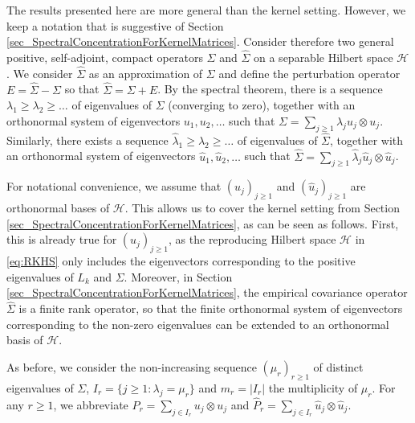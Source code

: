 \documentclass[a4paper,11pt]{article} %
\numberwithin{equation}{section}
\theoremstyle{definition}
\theoremstyle{remark}
\theoremstyle{plain}
\begin{document}
The results presented here are more general than the kernel setting.
However, we keep a notation that is suggestive of Section \ref{sec_SpectralConcentrationForKernelMatrices}.
Consider therefore two general positive, self-adjoint, compact operators \( \Sigma \) and \( \widehat{\Sigma} \) on a separable Hilbert space \( \mathcal{H} \).
We consider $\widehat \Sigma$ as an approximation of $\Sigma$ and define the perturbation operator $E = \widehat \Sigma - \Sigma$ so that $\widehat \Sigma = \Sigma + E$.
By the spectral theorem, there is a sequence $ \lambda_1 \ge \lambda_2 \ge \dots $ of eigenvalues of $\Sigma$ (converging to zero), together with an orthonormal system of eigenvectors $u_1, u_2, \dots$ such that $\Sigma = \sum_{j\geq 1}\lambda_j u_j \otimes u_j$. 
Similarly, there exists a sequence $ \widehat{\lambda}_1 \ge \widehat{\lambda}_2 \ge \dots $ of eigenvalues of $\widehat \Sigma$, together with an orthonormal system of eigenvectors $ \widehat{u}_1, \widehat{u}_2, \dots $ such that $\widehat{\Sigma} = \sum_{j \ge 1} \widehat{\lambda}_j \widehat u_j \otimes \widehat u_j$.

For notational convenience, we assume that \( (u_{j})_{j \ge 1} \) and \( (\widehat{u}_{j})_{j \ge 1} \) are orthonormal bases of \( \mathcal{H} \). This allows us to cover the kernel setting from Section \ref{sec_SpectralConcentrationForKernelMatrices}, as can be seen as follows. First, this is already true for \( (u_{j})_{j \ge 1} \), as the reproducing Hilbert space $\mathcal{H}$ in \eqref{eq:RKHS} only includes the eigenvectors corresponding to the positive eigenvalues of $L_k$ and $\Sigma$. Moreover, in Section \ref{sec_SpectralConcentrationForKernelMatrices}, the empirical covariance operator $\widehat{\Sigma}$ is a finite rank operator, so that the finite orthonormal system of eigenvectors corresponding to the non-zero eigenvalues can be extended to an orthonormal basis of $\mathcal{H}$.

As before, we consider the non-increasing sequence \( (\mu_{r})_{r \ge 1} \) of distinct eigenvalues of \( \Sigma \), \( I_{r} = \{ j \ge 1: \lambda_{j} = \mu_{r} \} \) and \( m_{r}=|I_r| \) the multiplicity of \( \mu_{r} \). For any \( r \ge 1 \), we abbreviate \( P_{r} = \sum_{j \in I_{r}} u_{j} \otimes u_{j} \) and \( \widehat{P}_{r} = \sum_{j \in I_{r}} \widehat{u}_{j} \otimes \widehat{u}_{j} \).
\end{document}
